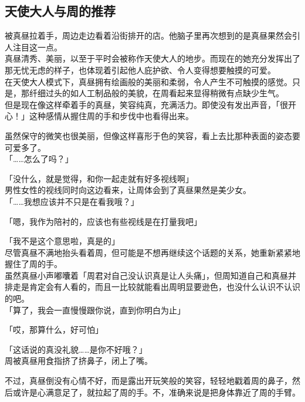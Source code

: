 \subsection{天使大人与周的推荐}

被真昼拉着手，周边走边看着沿街排开的店。他脑子里再次想到的是真昼果然会引人注目这一点。\\

真昼清秀、美丽，以至于平时会被称作天使大人的地步。而现在的她充分发挥出了那无忧无虑的样子，也体现着引起他人庇护欲、令人变得想要触摸的可爱。\\

在天使大人模式下，真昼拥有绘画般的美丽和柔弱，令人产生不可触摸的感觉。只是，那纤细过头的如人工制品般的美貌，在周看起来显得稍微有点缺少生气。\\

但是现在像这样牵着手的真昼，笑容纯真，充满活力。即使没有发出声音，「很开心！」这种感情从握住周的手和步伐中也看得出来。

虽然保守的微笑也很美丽，但像这样喜形于色的笑容，看上去比那种表面的姿态要可爱多了。\\

「……怎么了吗？」

「没什么，就是觉得，和你一起走就有好多视线啊」\\

男性女性的视线同时向这边看来，让周体会到了真昼果然是美少女。\\

「……我想应该并不只是在看我哦？」

「嗯，我作为陪衬的，应该也有些视线是在打量我吧」

「我不是这个意思啦，真是的」\\

尽管真昼不满地抬头看着周，但可能是不想再继续这个话题的关系，她重新紧紧地握住了周的手。\\

虽然真昼小声嘟囔着「周君对自己没认识真是让人头痛」，但周知道自己和真昼并排走是肯定会有人看的，而且一比较就能看出周明显要逊色，也没什么认识不认识的吧。\\

「算了，我会一直慢慢跟你说，直到你明白为止」

「哎，那算什么，好可怕」

「这话说的真没礼貌……是你不好哦？」\\

周被真昼用食指挤了挤鼻子，闭上了嘴。

不过，真昼倒没有心情不好，而是露出开玩笑般的笑容，轻轻地戳着周的鼻子，然后或许是心满意足了，就拉起了周的手。不，准确来说是把身体靠近了周的手臂。\\

